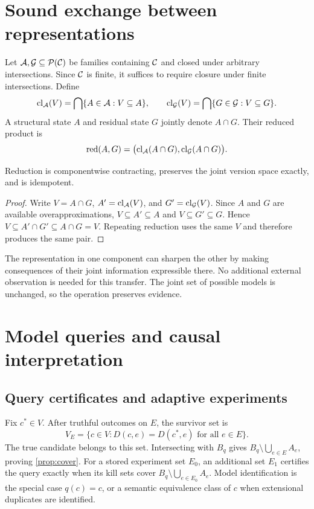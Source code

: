 \section{Sound exchange between representations}\label{app:reduction}
Let $\mathcal A,\mathcal G\subseteq\mathcal P(\mathcal C)$ be families containing $\mathcal C$ and closed under arbitrary intersections. Since $\mathcal C$ is finite, it suffices to require closure under finite intersections. Define
\[
 \operatorname{cl}_{\mathcal A}(V)=\bigcap\{A\in\mathcal A:V\subseteq A\},\qquad
 \operatorname{cl}_{\mathcal G}(V)=\bigcap\{G\in\mathcal G:V\subseteq G\}.
\]
A structural state $A$ and residual state $G$ jointly denote $A\cap G$. Their reduced product \citep{cousot1979} is
\[
 \operatorname{red}(A,G)=
 \bigl(\operatorname{cl}_{\mathcal A}(A\cap G),\operatorname{cl}_{\mathcal G}(A\cap G)\bigr).
\]
\begin{proposition}
Reduction is componentwise contracting, preserves the joint version space exactly, and is idempotent.
\end{proposition}
\begin{proof}
Write $V=A\cap G$, $A'=\operatorname{cl}_{\mathcal A}(V)$, and $G'=\operatorname{cl}_{\mathcal G}(V)$. Since $A$ and $G$ are available overapproximations, $V\subseteq A'\subseteq A$ and $V\subseteq G'\subseteq G$. Hence $V\subseteq A'\cap G'\subseteq A\cap G=V$. Repeating reduction uses the same $V$ and therefore produces the same pair.
\end{proof}
The representation in one component can sharpen the other by making consequences of their joint information expressible there. No additional external observation is needed for this transfer. The joint set of possible models is unchanged, so the operation preserves evidence.

\section{Model queries and causal interpretation}\label{app:causal}
\subsection{Query certificates and adaptive experiments}
Fix $c^*\in V$. After truthful outcomes on $E$, the survivor set is
\[
 V_E=\{c\in V:D(c,e)=D(c^*,e)\text{ for all }e\in E\}.
\]
The true candidate belongs to this set. Intersecting with $B_q$ gives $B_q\setminus\bigcup_{e\in E}A_e$, proving \cref{prop:cover}. For a stored experiment set $E_0$, an additional set $E_1$ certifies the query exactly when its kill sets cover $B_q\setminus\bigcup_{e\in E_0}A_e$. Model identification is the special case $q(c)=c$, or a semantic equivalence class of $c$ when extensional duplicates are identified.


